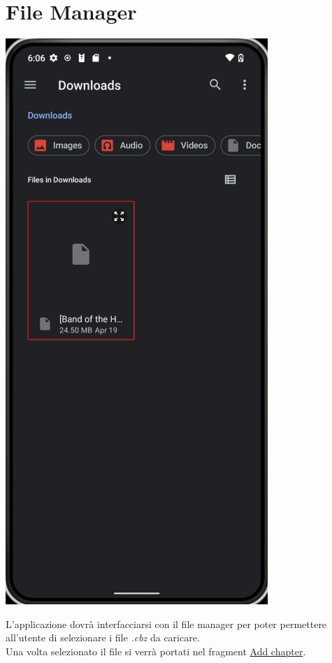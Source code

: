 \documentclass{report}
\begin{document}
\section{File Manager}

\begin{center}
  \includegraphics[scale=0.4]{file_manager.png}
\end{center}

L'applicazione dovrà interfacciarsi con il file manager per poter permettere all'utente di selezionare i file \emph{.cbz} da caricare.\\
Una volta selezionato il file si verrà portati nel fragment \hyperref[sec:add_chapter]{Add chapter}.
\end{document}
